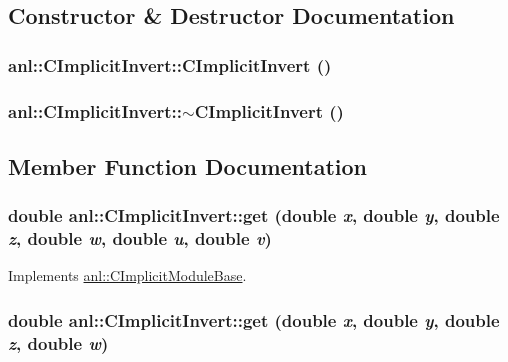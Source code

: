 \subsection{Constructor \& Destructor Documentation}
\hypertarget{classanl_1_1CImplicitInvert_a08bdf6e919c0250c2179c7eba3a8c51a}{
\subsubsection[{CImplicitInvert}]{\setlength{\rightskip}{0pt plus 5cm}anl::CImplicitInvert::CImplicitInvert ()}}
\label{classanl_1_1CImplicitInvert_a08bdf6e919c0250c2179c7eba3a8c51a}
\hypertarget{classanl_1_1CImplicitInvert_aa11eae3c784e63fb5773488a55c83195}{
\subsubsection[{$\sim$CImplicitInvert}]{\setlength{\rightskip}{0pt plus 5cm}anl::CImplicitInvert::$\sim$CImplicitInvert ()}}
\label{classanl_1_1CImplicitInvert_aa11eae3c784e63fb5773488a55c83195}


\subsection{Member Function Documentation}
\hypertarget{classanl_1_1CImplicitInvert_aa09f4c5c466e8c83b0125260363d23bc}{
\subsubsection[{get}]{\setlength{\rightskip}{0pt plus 5cm}double anl::CImplicitInvert::get (double {\em x}, \/  double {\em y}, \/  double {\em z}, \/  double {\em w}, \/  double {\em u}, \/  double {\em v})}}
\label{classanl_1_1CImplicitInvert_aa09f4c5c466e8c83b0125260363d23bc}


Implements \hyperlink{classanl_1_1CImplicitModuleBase_aa40b7d54572197612a4fea44b63447eb}{anl::CImplicitModuleBase}.\hypertarget{classanl_1_1CImplicitInvert_aa27168b58b90f1f84e199343de0a91a7}{
\subsubsection[{get}]{\setlength{\rightskip}{0pt plus 5cm}double anl::CImplicitInvert::get (double {\em x}, \/  double {\em y}, \/  double {\em z}, \/  double {\em w})}}
\label{classanl_1_1CImplicitInvert_aa27168b58b90f1f84e199343de0a91a7}


